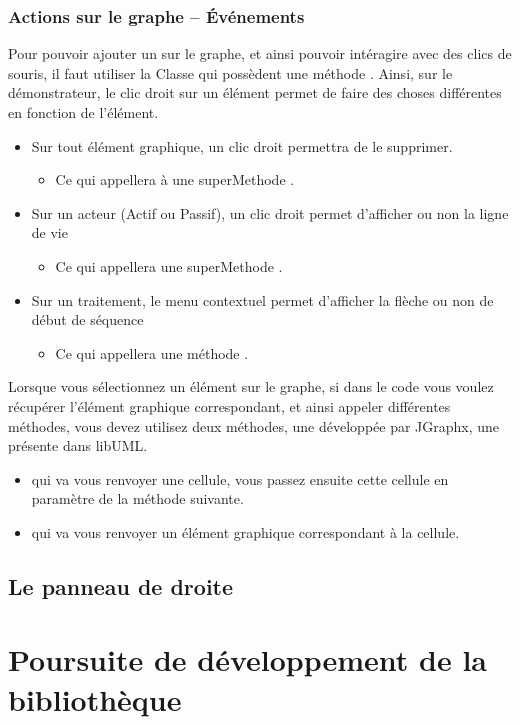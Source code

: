 \documentclass[12pt,a4paper,openany]{report}
\begin{document}
	\subsection{Actions sur le graphe -- Événements}
	Pour pouvoir ajouter un  sur le graphe, et ainsi pouvoir intéragire avec des clics de souris, 
	il faut utiliser la Classe  qui possèdent une méthode .
	Ainsi, sur le démonstrateur, le clic droit sur un élément permet de faire des choses différentes en fonction de l'élément. \\
	\begin{itemize}
		\item Sur tout élément graphique, un clic droit permettra de le supprimer.
			\begin{itemize}
				\item Ce qui appellera à une superMethode .
			\end{itemize}
		\item Sur un acteur (Actif ou Passif), un clic droit permet d'afficher ou non la ligne de vie
			\begin{itemize}
				\item Ce qui appellera une superMethode .
			\end{itemize}
		\item Sur un traitement, le menu contextuel permet d'afficher la flèche ou non de début de séquence
			\begin{itemize}
				\item Ce qui appellera une méthode .
			\end{itemize}
	\end{itemize}

	Lorsque vous sélectionnez un élément sur le graphe, si dans le code vous voulez récupérer l'élément graphique correspondant, 
	et ainsi appeler différentes méthodes, vous devez utilisez deux méthodes, une développée par JGraphx, une présente dans libUML. 
	\begin{itemize}
		\item {} qui va vous renvoyer une cellule, vous passez ensuite cette cellule en paramètre de la méthode suivante.
		\item {} qui va vous renvoyer un élément graphique correspondant à la cellule.
	\end{itemize}
	
	\section{Le panneau de droite}

	
	\chapter{Poursuite de développement de la bibliothèque}				

	\closeout\glossaireVar
	\appendix
	\begin{sortedlist}
    
	\end{sortedlist}
\end{document}

